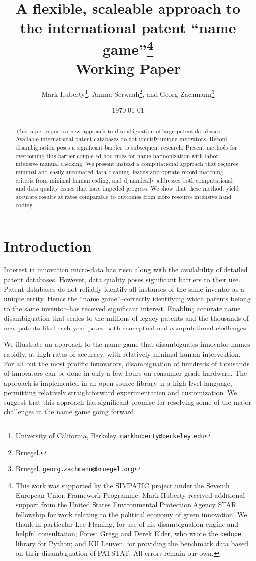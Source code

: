 \documentclass[11pt]{article}
\title{A flexible, scaleable approach to the international patent
  ``name game''\thanks{This
    work was supported by the SIMPATIC project under the Seventh European Union Framework Programme. Mark Huberty received additional support from the United States
    Environmental Protection Agency STAR fellowship for work relating to
    the political economy of green innovation. We thank in particular
    Lee Fleming, for use of his disambiguation engine and helpful consultation; Forest
    Gregg and Derek Elder, who wrote the \texttt{dedupe} library for
    Python; and KU Leuven, for providing the benchmark data based on
    their disambiguation of PATSTAT. All errors remain our own.}\\
  Working Paper}
\author{Mark Huberty\thanks{University of California,
    Berkeley. \texttt{markhuberty@berkeley.edu}}, Amma
  Serwaah\thanks{Bruegel.}, and Georg Zachmann\thanks{Bruegel. \texttt{georg.zachmann@bruegel.org}}}
\date{\today}
\begin{document}
\maketitle
\doublespacing

\begin{abstract}
  This paper reports a new approach to disambiguation of large patent
databases. Available international patent databases do not identify
unique innovators. Record disambiguation poses a significant barrier
to subsequent research. Present methods for overcoming this barrier
couple ad-hoc rules for name harmonization with labor-intensive manual
checking. We present instead a computational approach that requires
minimal and easily automated data cleaning, learns
appropriate record matching criteria from minimal human coding, and
dynamically addresses both
computational and data quality issues that have impeded progress. We show
that these methods yield accurate results at rates comparable to
outcomes from more resource-intensive hand coding.
\end{abstract}


\section{Introduction}
\label{sec:introduction}

Interest in innovation micro-data has risen along with the availability
of detailed patent databases. However, data quality poses significant
barriers to their use. Patent databases do not reliably identify all
instances of the same inventor as a unique entity. Hence the ``name
game''--correctly identifying which patents belong to the same
inventor--has received significant interest. Enabling accurate name
disambiguation that scales to the millions of legacy patents and the
thousands of new patents filed each year poses both conceptual and
computational challenges. 

We illustrate an approach to the name game that disambiguates
innovator names rapidly, at high rates of accuracy, with relatively
minimal human intervention. For all but the most prolific innovators,
disambiguation of hundreds of thousands of innovators can be done in
only a few hours on consumer-grade hardware. The approach is
implemented in an open-source library in a high-level language,
permitting relatively straightforward experimentation and
customization. We suggest that this approach has significant promise
for resolving some of the major challenges in the name game going
forward.
\end{document}
